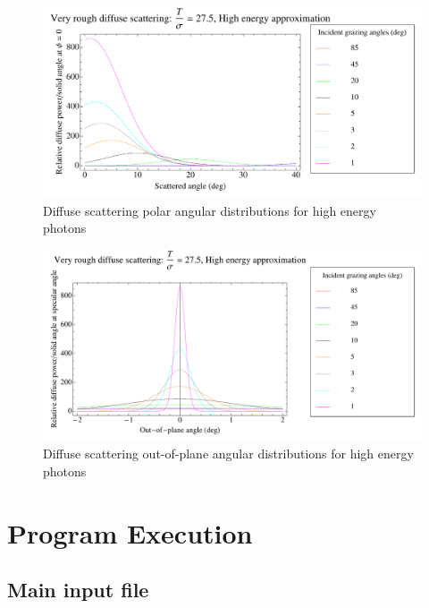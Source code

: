 \documentclass[11pt]{article}
\begin{document}
    \begin{figure}
  \centering
  \includegraphics[width=6in]{Diffuse-polar-HE}
   \caption{   \label{f:Diffuse.polar.HE}
    Diffuse scattering polar angular distributions for high energy photons}
   \end{figure}
      \begin{figure}
  \centering
  \includegraphics[width=6in]{Diffuse-out-of-plane-HE}
   \caption{   \label{f:Diffuse.out.of.plane.HE}
   Diffuse scattering out-of-plane angular distributions for high energy photons}
   \end{figure}

\section{Program Execution} 
\label{s:prog}

\subsection{Main input file} 
\label{s:main.file}
\end{document}
